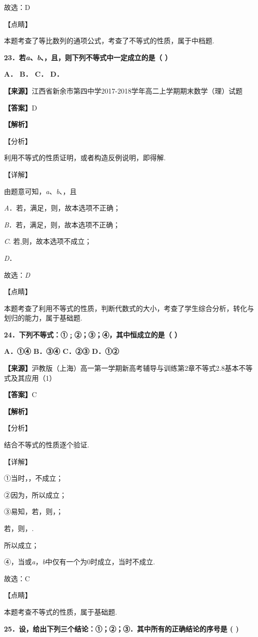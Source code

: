 \documentclass[
]{article}
\begin{document}
故选：D

【点睛】

本题考查了等比数列的通项公式，考查了不等式的性质，属于中档题.

\textbf{23．若\emph{a}、\emph{b}、，且，则下列不等式中一定成立的是（ ）}

\textbf{A． B． C． D．}

\textbf{【来源】}江西省新余市第四中学2017-2018学年高二上学期期末数学（理）试题

\textbf{【答案】}D

\textbf{【解析】}

【分析】

利用不等式的性质证明，或者构造反例说明，即得解.

【详解】

由题意可知，\emph{a}、\emph{b}、，且

\emph{A}．若，满足，则，故本选项不正确；

\emph{B}．若，满足，则，故本选项不正确；

\emph{C}. 若,则，故本选项不成立；

\emph{D}．

故选：\emph{D}

【点睛】

本题考查了利用不等式的性质，判断代数式的大小，考查了学生综合分析，转化与划归的能力，属于基础题.

\textbf{24．下列不等式：①﹔②；③；④，其中恒成立的是（ ）}

\textbf{A．①④ B．③④ C．②③ D．①②}

\textbf{【来源】}沪教版（上海）高一第一学期新高考辅导与训练第2章不等式2.8基本不等式及其应用（1）

\textbf{【答案】}C

\textbf{【解析】}

【分析】

结合不等式的性质逐个验证.

【详解】

①当时，，不成立；

②因为，所以成立；

③易知，若，则，；

若，则，.

所以成立；

④，当或\emph{a}，\emph{b}中仅有一个为0时成立，当时不成立.

故选：C

【点睛】

本题考查不等式的性质，属于基础题.

\textbf{25．设，给出下列三个结论：①；②；③．其中所有的正确结论的序号是 (
)}
\end{document}
